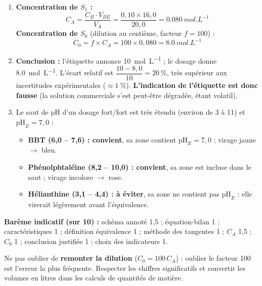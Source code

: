 \documentclass[11pt]{article}
\begin{document}
\begin{corrige}
\begin{enumerate}
\textbf{Méthode des tangentes parallèles :} on trace deux tangentes à la courbe, parallèles entre elles, de part et d'autre du saut de pH ; on trace ensuite la droite parallèle à ces deux tangentes et équidistante : elle coupe la courbe au point d'équivalence E, dont on lit les coordonnées $(V_{BE}\,;\,\mathrm{pH}_E)$.

\item \textbf{Concentration de $S_1$ :}
\[ C_A = \frac{C_B \cdot V_{BE}}{V_A} = \frac{0,10 \times 16,0}{20,0} = \SI{0,080}{mol.L^{-1}} \]
\textbf{Concentration de $S_0$} (dilution au centième, facteur $f = 100$) :
\[ C_0 = f \times C_A = 100 \times 0,080 = \SI{8,0}{mol.L^{-1}} \]

\item \textbf{Conclusion :} l'étiquette annonce \SI{10}{mol.L^{-1}} ; le dosage donne \SI{8,0}{mol.L^{-1}}. L'écart relatif est $\dfrac{10 - 8,0}{10} = 20\ \%$, très supérieur aux incertitudes expérimentales ($\approx 1\ \%$). \textbf{L'indication de l'étiquette est donc fausse} (la solution commerciale s'est peut-être dégradée,  étant volatil).

\item Le saut de pH d'un dosage fort/fort est très étendu (environ de 3 à 11) et $\mathrm{pH}_E = 7,0$ :
\begin{itemize}
\item \textbf{BBT (6,0 -- 7,6) : convient}, sa zone contient $\mathrm{pH}_E = 7,0$ ; virage jaune $\to$ bleu.
\item \textbf{Phénolphtaléine (8,2 -- 10,0) : convient}, sa zone est incluse dans le saut ; virage incolore $\to$ rose.
\item \textbf{Hélianthine (3,1 -- 4,4) : à éviter}, sa zone ne contient pas $\mathrm{pH}_E$ : elle virerait légèrement avant l'équivalence.
\end{itemize}
\end{enumerate}

\textbf{Barème indicatif (sur 10) :} schéma annoté 1,5 ; équation-bilan 1 ; caractéristiques 1 ; définition équivalence 1 ; méthode des tangentes 1 ; $C_A$ 1,5 ; $C_0$ 1 ; conclusion justifiée 1 ; choix des indicateurs 1.
\end{corrige}

\begin{attention}
Ne pas oublier de \textbf{remonter la dilution} ($C_0 = 100\,C_A$) : oublier le facteur 100 est l'erreur la plus fréquente. Respecter les chiffres significatifs et convertir les volumes en litres dans les calculs de quantités de matière.
\end{attention}
\end{document}
